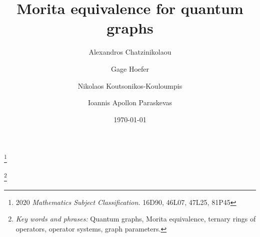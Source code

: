 \documentclass[11pt]{amsart}
\numberwithin{equation}{section}
\theoremstyle{plain}
\theoremstyle{definition}
\theoremstyle{remark}
\begin{document}

\title[Morita equivalence for quantum graphs]{Morita equivalence for  quantum graphs}

\author[A. Chatzinikolaou]{Alexandros Chatzinikolaou}
\address{Institut Mittag-Leffler\\ The Royal Swedish Academy of Sciences \\ Djursholm\\ Sweden}



\author[G. Hoefer]{Gage Hoefer}
\address{Department of Mathematics \\ Dartmouth College \\ Hanover \\ NH 03755 \\ USA}


\author[N. Koutsonikos-Kouloumpis]{Nikolaos Koutsonikos-Kouloumpis}
\address{Department of Mathematics\\ University of Patras\\
Patras\\ 265 04\\ Greece}



\author[I.A. Paraskevas]{Ioannis Apollon Paraskevas}
\address{Department of Mathematics\\ National and Kapodistrian University of Athens\\ Athens\\ 1578 84\\ Greece}

\thanks{2020 {\it  Mathematics Subject Classification.} 16D90, 46L07, 47L25, 81P45}

\thanks{{\it Key words and phrases:} Quantum graphs, Morita equivalence, ternary rings of operators, operator systems, graph parameters.}

\date{\today}
\end{document}
